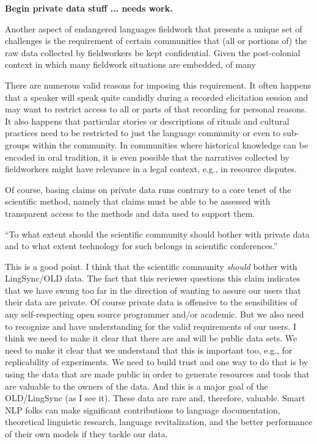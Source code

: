 \documentclass[11pt]{article}
\begin{document}
\textbf{Begin private data stuff ... needs work.}

Another aspect of endangered languages fieldwork that presents a unique set of
challenges is the requirement of certain communities that (all or portions of)
the raw data collected by fieldworkers be kept confidential. Given the
post-colonial context in which many fieldwork situations are embedded, of many 

There are numerous valid reasons for imposing this requirement. It often happens that a speaker
will speak quite candidly during a recorded elicitation session and may want to
restrict access to all or parts of that recording for personal reasons. It also
happens that particular stories or descriptions of rituals and cultural
practices need to be restricted to just the language community or even to
sub-groups within the community. In communities where historical knowledge can
be encoded in oral tradition, it is even possible that the narratives collected
by fieldworkers might have relevance in a legal context, e.g., in resource
disputes.

Of course, basing claims on private data runs contrary to a core tenet of the
scientific method, namely that claims must be able to be assessed with
transparent access to the methods and data used to support them.


``To what extent should the scientific community should bother with private data
and to what extent technology for such belongs in scientific conferences.''

This is a good point. I think that the scientific community \textit{should}
bother with LingSync/OLD data. The fact that this reviewer questions this claim
indicates that we have swung too far in the direction of wanting to assure our
users that their data are private. Of course private data is offensive to the
sensibilities of any self-respecting open source programmer and/or academic.
But we also need to recognize and have understanding for the valid requirements
of our users. I think we need to make it clear that there are and will be
public data sets. We need to make it clear that we understand that this is
important too, e.g., for replicability of experiments. We need to build trust
and one way to do that is by using the data that are made public in order to 
generate resources and tools that are valuable to the owners of the data. And 
this is a major goal of the OLD/LingSync (as I see it). These data are rare
and, therefore, valuable. Smart NLP folks can make significant contributions to
language documentation, theoretical linguistic research, language
revitalization, and the better performance of their own models if they tackle
our data.
\end{document}
